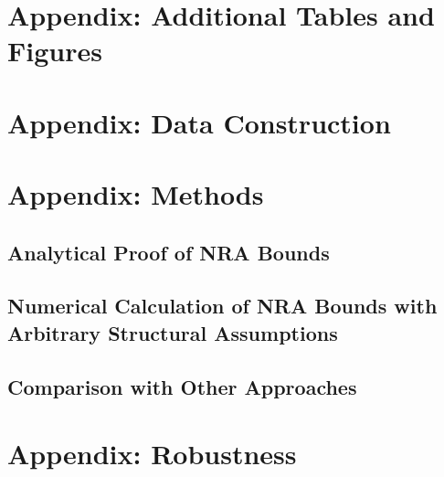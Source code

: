 \documentclass[12pt,letterpaper]{article}
\numberwithin{equation}{section}
\begin{document}
\begin{appendix}

\renewcommand{\thetable}{A\arabic{table}}
\setcounter{table}{0}
\renewcommand{\thefigure}{A\arabic{figure}}
\setcounter{figure}{0}
\section{Appendix: Additional Tables and Figures} 
\label{sec:app_figs}


\newpage 
\clearpage 
\section{Appendix: Data Construction}
\label{sec:app_data}
\normalsize  

\newpage 
\clearpage
\section{Appendix: Methods}
\renewcommand{\thefigure}{C\arabic{figure}}
\setcounter{figure}{0}
\renewcommand{\thetable}{C\arabic{table}}
\setcounter{table}{0}

\subsection{Analytical Proof of NRA Bounds}
\label{sec:app_proofs}
\normalsize  

\subsection{Numerical Calculation of NRA Bounds with Arbitrary Structural Assumptions} 
\label{sec:app_numerical} 
\normalsize 

\subsection{Comparison with Other Approaches} 
\label{sec:app_comparison} 
\normalsize 

\newpage 
\clearpage 

\renewcommand{\thetable}{D\arabic{table}}
\renewcommand{\thefigure}{D\arabic{figure}}
\setcounter{table}{0}
\setcounter{figure}{0}

\section{Appendix: Robustness}
\label{sec:app_robust}


\end{appendix}
\end{document}
